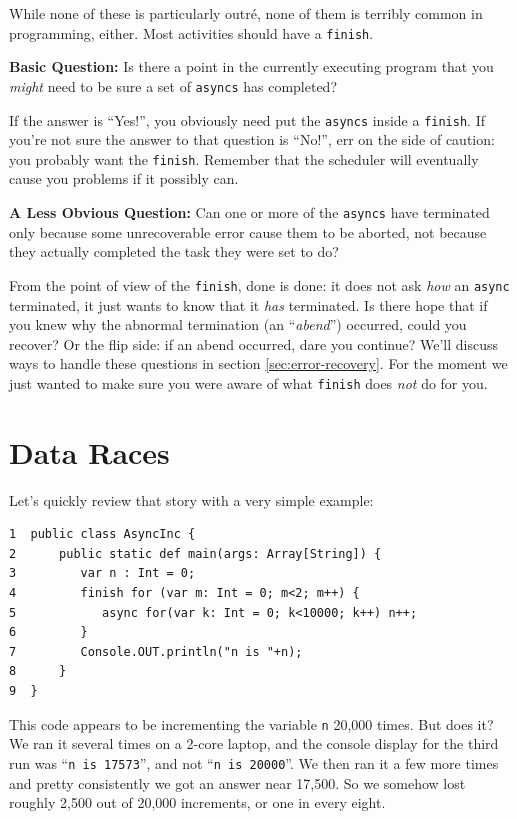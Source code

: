 While none of these is particularly outr\'{e}, none of them is terribly common in \Xten{}
programming, either.   Most activities should have a {\tt finish}.

{\bf Basic Question:} Is there a point in the currently executing program that
you {\em might} need to be sure a set of {\tt asyncs} has completed?  

If the
answer is ``Yes!'',   you obviously need put the {\tt asyncs} inside a {\tt finish}.
If you're not sure the answer to that question is ``No!'', err on the side of caution:
you probably want the {\tt finish}.   Remember that the scheduler will eventually
cause you problems if it possibly can.

{\bf A Less Obvious Question:} Can one or
more of the {\tt asyncs} have terminated only because some unrecoverable
error cause them to be aborted, not because they actually completed the task
they were set to do?  

From the point of view of the {\tt finish}, done is
done: it does not ask {\em how} an {\tt async} terminated, it just wants to know
that it {\em has} terminated.  Is there hope that if you knew why the abnormal
termination (an ``{\em abend}'') occurred, could you recover? 
Or the flip side: if an abend occurred, dare you continue?  We'll discuss ways
to handle these questions in section \ref{sec:error-recovery}.  For the moment
we just wanted to make sure you were aware of what {\tt finish} does {\em not} do for you.

\section{Data Races}
 Let's quickly review that story with a very simple example:
\begin{verbatim}
1  public class AsyncInc {
2      public static def main(args: Array[String]) {
3         var n : Int = 0;
4         finish for (var m: Int = 0; m<2; m++) {
5            async for(var k: Int = 0; k<10000; k++) n++; 
6         }
7         Console.OUT.println("n is "+n);
8      }
9  }
\end{verbatim}
This code appears to be incrementing the variable {\tt n} 20,000 times.  
But does it?  We ran it several times on a 2-core laptop, and the console display
for the third run was ``{\tt n is 17573}'', and not ``{\tt n is 20000}''.
We then ran it a few more times and pretty consistently we got an answer
near 17,500.  So we somehow lost roughly 2,500 out of 20,000 increments,
or one in every eight.

